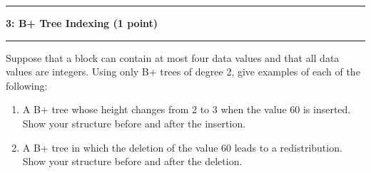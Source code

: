 \documentclass[11pt]{article}
\newcommand\question[2]{\vspace{.25in}\hrule\textbf{#1: #2}\vspace{.5em}\hrule\vspace{.10in}}
\begin{document}
\question{3}{B+ Tree Indexing (1 point)}
Suppose that a block can contain at most four data values and that all data values are integers. Using only B+ trees of degree 2, give examples of each of the following:
\begin{enumerate}
	\item A B+ tree whose height changes from 2 to 3 when the value 60 is inserted. Show your structure before and after the insertion.
	

	
	\item A B+ tree in which the deletion of the value 60 leads to a redistribution. Show your structure before and after the deletion.
	

\end{enumerate}
\end{document}
